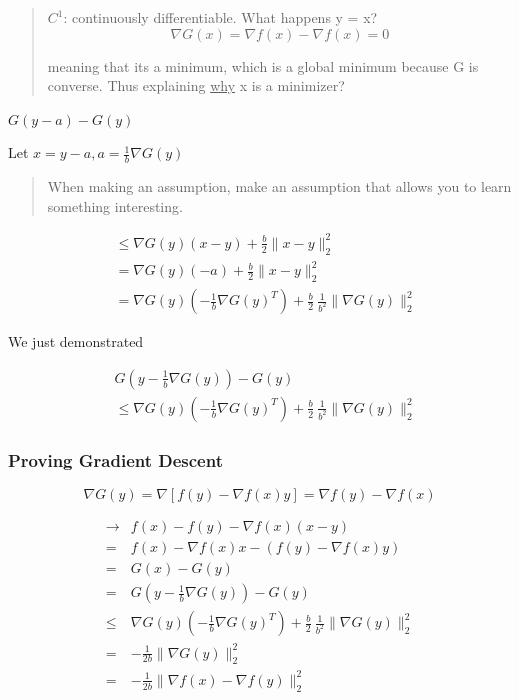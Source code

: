 \documentclass[11pt]{article}
\begin{document}
\begin{quote}
\(C^1\): continuously differentiable.
What happens y = x?
$$
\nabla G(x) = \nabla f(x) - \nabla f(x) = 0
$$

meaning that its a minimum, which is a global minimum because G is converse.
Thus explaining \uline{why} x is a minimizer?
\end{quote}

\(G(y - a) - G(y)\)

Let \(x = y - a, a = \frac{1}{b} \nabla G(y)\)

\begin{quote}
When making an assumption, make an assumption that allows you to learn something interesting.
\end{quote}

\begin{equation}
\begin{split}
& \leq \nabla G(y)(x - y) + \frac{b}{2} \|x - y\|_2^2\\
& = \nabla G(y)(-a) + \frac{b}{2} \|x - y\|_2^2\\
& = \nabla G(y)(- \frac{1}{b} \nabla G(y)^T) + \frac{b}{2} \ \frac{1}{b^2} \|\nabla G(y)\|_2^2
\end{split}
\end{equation}

We just demonstrated

\begin{equation}
\begin{split}
& G(y - \frac{1}{b} \nabla G(y)) - G(y)\\
& \leq \nabla G(y)(- \frac{1}{b} \nabla G(y)^T) + \frac{b}{2} \ \frac{1}{b^2} \|\nabla G(y)\|_2^2
\end{split}
\end{equation}

\subsubsection{Proving Gradient Descent}
\label{sec:org5d0ce5e}


$$
\nabla G(y) = \nabla [f(y) - \nabla f(x) y] = \nabla f(y) - \nabla f(x)
$$

\begin{subequations}
\label{first:main}
\begin{align}
\to & f(x) - f(y) - \nabla f(x) (x - y)\\
= & f(x) - \nabla f(x) x - (f(y) - \nabla f(x) y)\\
= & G(x) - G(y)\\
= & G(y - \frac{1}{b} \nabla G(y)) - G(y)\\
\leq & \nabla G(y)(- \frac{1}{b} \nabla G(y)^T) + \frac{b}{2} \ \frac{1}{b^2} \|\nabla G(y)\|_2^2\\
= & - \frac{1}{2b} \|\nabla G(y)\|_2^2\\
= & - \frac{1}{2b} \|\nabla f(x) - \nabla f(y)\|_2^2
\end{align}
\end{subequations}
\end{document}
